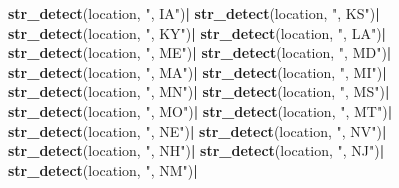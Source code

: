 \documentclass[
]{article}
\newenvironment{Shaded}{\begin{snugshade}}{\end{snugshade}}
\newcommand{\KeywordTok}[1]{\textcolor[rgb]{0.13,0.29,0.53}{\textbf{#1}}}
\newcommand{\NormalTok}[1]{#1}
\newcommand{\OperatorTok}[1]{\textcolor[rgb]{0.81,0.36,0.00}{\textbf{#1}}}
\newcommand{\StringTok}[1]{\textcolor[rgb]{0.31,0.60,0.02}{#1}}
\begin{document}
\begin{Shaded}
\begin{Highlighting}[]
{{\StringTok{                                                  }\KeywordTok{str_detect}\NormalTok{(location, }\StringTok{", IA"}\NormalTok{)}\OperatorTok{|}
\StringTok{                                                  }\KeywordTok{str_detect}\NormalTok{(location, }\StringTok{", KS"}\NormalTok{)}\OperatorTok{|}
\StringTok{                                                  }\KeywordTok{str_detect}\NormalTok{(location, }\StringTok{", KY"}\NormalTok{)}\OperatorTok{|}
\StringTok{                                                  }\KeywordTok{str_detect}\NormalTok{(location, }\StringTok{", LA"}\NormalTok{)}\OperatorTok{|}
\StringTok{                                                  }\KeywordTok{str_detect}\NormalTok{(location, }\StringTok{", ME"}\NormalTok{)}\OperatorTok{|}
\StringTok{                                                  }\KeywordTok{str_detect}\NormalTok{(location, }\StringTok{", MD"}\NormalTok{)}\OperatorTok{|}
\StringTok{                                                  }\KeywordTok{str_detect}\NormalTok{(location, }\StringTok{", MA"}\NormalTok{)}\OperatorTok{|}
\StringTok{                                                  }\KeywordTok{str_detect}\NormalTok{(location, }\StringTok{", MI"}\NormalTok{)}\OperatorTok{|}
\StringTok{                                                  }\KeywordTok{str_detect}\NormalTok{(location, }\StringTok{", MN"}\NormalTok{)}\OperatorTok{|}
\StringTok{                                                  }\KeywordTok{str_detect}\NormalTok{(location, }\StringTok{", MS"}\NormalTok{)}\OperatorTok{|}
\StringTok{                                                  }\KeywordTok{str_detect}\NormalTok{(location, }\StringTok{", MO"}\NormalTok{)}\OperatorTok{|}
\StringTok{                                                  }\KeywordTok{str_detect}\NormalTok{(location, }\StringTok{", MT"}\NormalTok{)}\OperatorTok{|}
\StringTok{                                                  }\KeywordTok{str_detect}\NormalTok{(location, }\StringTok{", NE"}\NormalTok{)}\OperatorTok{|}
\StringTok{                                                  }\KeywordTok{str_detect}\NormalTok{(location, }\StringTok{", NV"}\NormalTok{)}\OperatorTok{|}
\StringTok{                                                  }\KeywordTok{str_detect}\NormalTok{(location, }\StringTok{", NH"}\NormalTok{)}\OperatorTok{|}
\StringTok{                                                  }\KeywordTok{str_detect}\NormalTok{(location, }\StringTok{", NJ"}\NormalTok{)}\OperatorTok{|}
\StringTok{                                                  }\KeywordTok{str_detect}\NormalTok{(location, }\StringTok{", NM"}\NormalTok{)}\OperatorTok{|}
}}
\end{Highlighting}
\end{Shaded}
\end{document}
